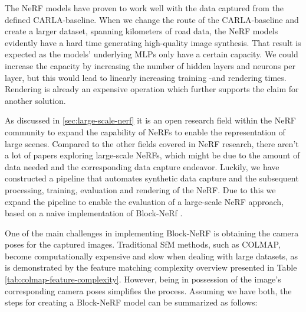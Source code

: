 \begin{comment}
Premise: Have found the CARLA-baseline to work well on shorter segments. As discussed multiple papers, the capacity is limited.
Premise \#2: Since I operate in a synthetic environment, I have perfect poses which simplifies the process.
Question: How do I implement Block-NeRF in Nerfstudio, given perfect poses?

\begin{itemize}
    \item Split the dataset into multiple datasets
    \item Train each seperately
    \item Create a camera path
    \item Render the camera path for each NeRF
\end{itemize}
\end{comment}

The NeRF models have proven to work well with the data captured from the defined CARLA-baseline. When we change the route of the CARLA-baseline and create a larger dataset, spanning kilometers of road data, the NeRF models evidently have a hard time generating high-quality image synthesis. That result is expected as the models' underlying MLPs only have a certain capacity. We could increase the capacity by increasing the number of hidden layers and neurons per layer, but this would lead to linearly increasing training -and rendering times. Rendering is already an expensive operation which further supports the claim for another solution.

As discussed in \autoref{sec:large-scale-nerf} it is an open research field within the NeRF community to expand the capability of NeRFs to enable the representation of large scenes. Compared to the other fields covered in NeRF research, there aren't a lot of papers exploring large-scale NeRFs, which might be due to the amount of data needed and the corresponding data capture endeavor. Luckily, we have constructed a pipeline that automates synthetic data capture and the subsequent processing, training, evaluation and rendering of the NeRF. Due to this we expand the pipeline to enable the evaluation of a large-scale NeRF approach, based on a naive implementation of Block-NeRf \cite{tancik_block-nerf_2022}.

One of the main challenges in implementing Block-NeRF is obtaining the camera poses for the captured images. Traditional SfM methods, such as COLMAP, become computationally expensive and slow when dealing with large datasets, as is demonstrated by the feature matching complexity overview presented in Table \ref{tab:colmap-feature-complexity}. However, being in possession of the image's corresponding camera poses simplifies the process. Assuming we have both, the steps for creating a Block-NeRF model can be summarized as follows:

